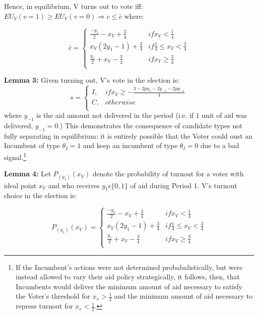 \documentclass[12pt]{paper}
\begin{document}
Hence, in equilibrium, V turns out to vote iff: $EU_V (v=1) \geq EU_V (v=0) \Rightarrow c \leq \bar{c}$ where:

\begin{equation}
\bar{c} =
\begin{cases}
\frac{-y_1}{2} - x_V + \frac{3}{4} & if x_V < \frac{1}{4} \\
x_V (2y_1 - 1) + \frac{3}{4}     & if \frac{1}{4} \leq x_V < \frac{3}{4}  \\
\frac{y_1}{2} + x_V - \frac{3}{4}     & if x_V \geq \frac{3}{4}  \\
\end{cases}
\end{equation}

\textbf{Lemma 3:}
Given turning out, V’s vote in the election is:
\begin{equation}
s =
\begin{cases}
I, & if x_V \geq -\frac{3 - 2py_1 - 2y_{-1} - 2py_{-1}}{4} \\    
C,     & otherwise  \\
\end{cases}
\end{equation}
where $y_{-1}$ is the aid amount not delivered in the period (i.e. if $1$ unit of aid was delivered, $y_{-1} = 0$.) This demonstrates the consequence of candidate types not fully separating in equilibrium: it is entirely possible that the Voter could oust an Incumbent of type $\theta_I = 1$ and keep an incumbent of type $\theta_I = 0$ due to a bad signal.\footnote{If the Incumbent's actions were not determined probabalistically, but were instead allowed to vary their aid policy strategically, it follows, then, that Incumbents would deliver the minimum amount of aid necessary to satisfy the Voter's threshold for $x_v > \frac{1}{2}$ and the minimum amount of aid necessary to repress turnout for $x_v < \frac{1}{2}$.}


\textbf{Lemma 4:} Let $P_(y_1 )(x_V )$ denote the probability of turnout for a voter with ideal point $x_V$ and who receives $y_1 \epsilon \{0,1\}$ of aid during Period 1. V’s turnout choice in the election is:

\begin{equation}
P_(y_1 )(x_V ) =
\begin{cases}
\frac{-y_1}{2} - x_V + \frac{3}{4} & if x_V < \frac{1}{4}\\    
x_V (2y_1 - 1) + \frac{3}{4}     & if \frac{1}{4} \leq x_V < \frac{3}{4}  \\
\frac{y_1}{2} + x_V - \frac{3}{4}     & if x_V \geq \frac{3}{4}  \\
\end{cases}
\end{equation}
\end{document}
